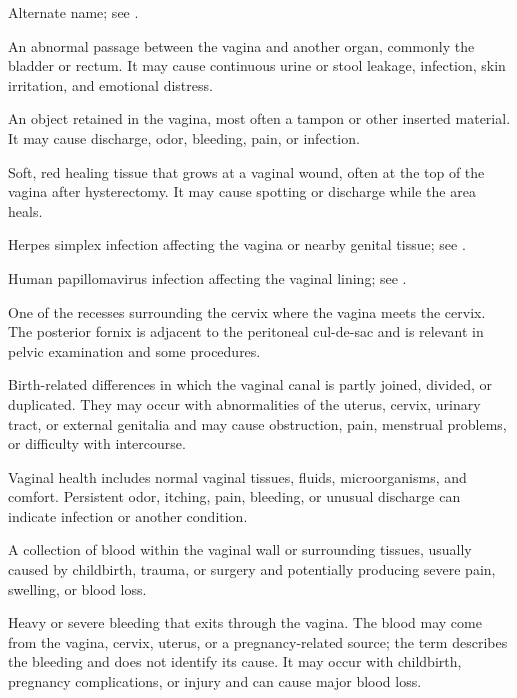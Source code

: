  Alternate name; see .

 An abnormal passage between the vagina and another organ, commonly the bladder or rectum. It may cause continuous urine or stool leakage, infection, skin irritation, and emotional distress.

 An object retained in the vagina, most often a tampon or other inserted material. It may cause discharge, odor, bleeding, pain, or infection.

 Soft, red healing tissue that grows at a vaginal wound, often at the top of the vagina after hysterectomy. It may cause spotting or discharge while the area heals.

 Herpes simplex infection affecting the vagina or nearby genital tissue; see .

 Human papillomavirus infection affecting the vaginal lining; see .

 One of the recesses surrounding the cervix where the vagina meets the cervix. The posterior fornix is adjacent to the peritoneal cul-de-sac and is relevant in pelvic examination and some procedures.

 Birth-related differences in which the vaginal canal is partly joined, divided, or duplicated. They may occur with abnormalities of the uterus, cervix, urinary tract, or external genitalia and may cause obstruction, pain, menstrual problems, or difficulty with intercourse.

 Vaginal health includes normal vaginal tissues, fluids, microorganisms, and comfort. Persistent odor, itching, pain, bleeding, or unusual discharge can indicate infection or another condition.

 A collection of blood within the vaginal wall or surrounding tissues, usually caused by childbirth, trauma, or surgery and potentially producing severe pain, swelling, or blood loss.

 Heavy or severe bleeding that exits through the vagina. The blood may come from the vagina, cervix, uterus, or a pregnancy-related source; the term describes the bleeding and does not identify its cause. It may occur with childbirth, pregnancy complications, or injury and can cause major blood loss.

